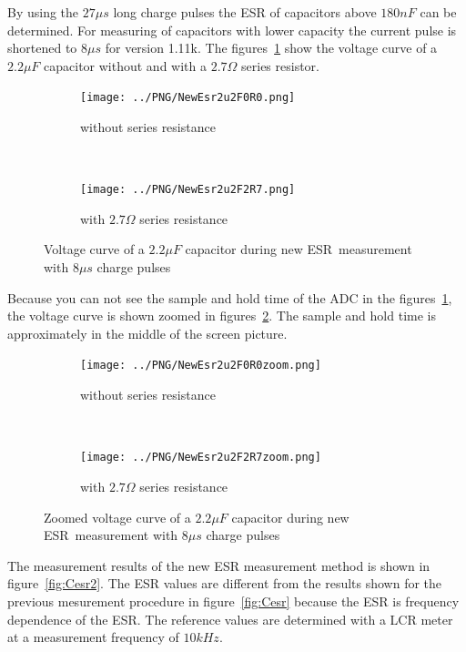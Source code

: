 By using the \(27\mu s\) long charge pulses the ESR of capacitors above \(180nF\) can be determined.
For measuring of capacitors with lower capacity the current pulse is shortened to \(8\mu s\) for version 1.11k.
The figures~\ref{pic:NewEsr2} show the voltage curve of a \(2.2\mu F\) capacitor without and with
a \(2.7\Omega\) series resistor.

\begin{figure}[H]
  \begin{subfigure}[b]{.5\textwidth}
    \centering
    \texttt{[image: ../PNG/NewEsr2u2F0R0.png]}
    \caption{without series resistance}
  \end{subfigure}
  ~
  \begin{subfigure}[b]{.5\textwidth}
    \centering
    \texttt{[image: ../PNG/NewEsr2u2F2R7.png]}
    \caption{with \(2.7\Omega\) series resistance}
  \end{subfigure}
  \caption{Voltage curve of a \(2.2\mu F\) capacitor during new ESR~measurement with \(8\mu s\) charge pulses}
  \label{pic:NewEsr2}
\end{figure}

Because you can not see the sample and hold time of the ADC in the figures~\ref{pic:NewEsr2},  the voltage curve is shown zoomed
in figures~\ref{pic:NewEsr2zoom}. The sample and hold time is approximately in the middle of the screen picture.

\begin{figure}[H]
  \begin{subfigure}[b]{.5\textwidth}
    \centering
    \texttt{[image: ../PNG/NewEsr2u2F0R0zoom.png]}
    \caption{without series resistance}
  \end{subfigure}
  ~
  \begin{subfigure}[b]{.5\textwidth}
    \centering
    \texttt{[image: ../PNG/NewEsr2u2F2R7zoom.png]}
    \caption{with \(2.7\Omega\) series resistance}
  \end{subfigure}
  \caption{Zoomed voltage curve of a \(2.2\mu F\) capacitor during new ESR~measurement with \(8\mu s\) charge pulses}
  \label{pic:NewEsr2zoom}
\end{figure}
 

The measurement results of the new ESR measurement method is shown in figure~\ref{fig:Cesr2}.
The ESR values are different from the results shown for the previous mesurement procedure in figure~\ref{fig:Cesr} because 
the ESR is frequency dependence of the ESR.
The reference values are determined with a LCR meter at a measurement frequency of \(10kHz \).

